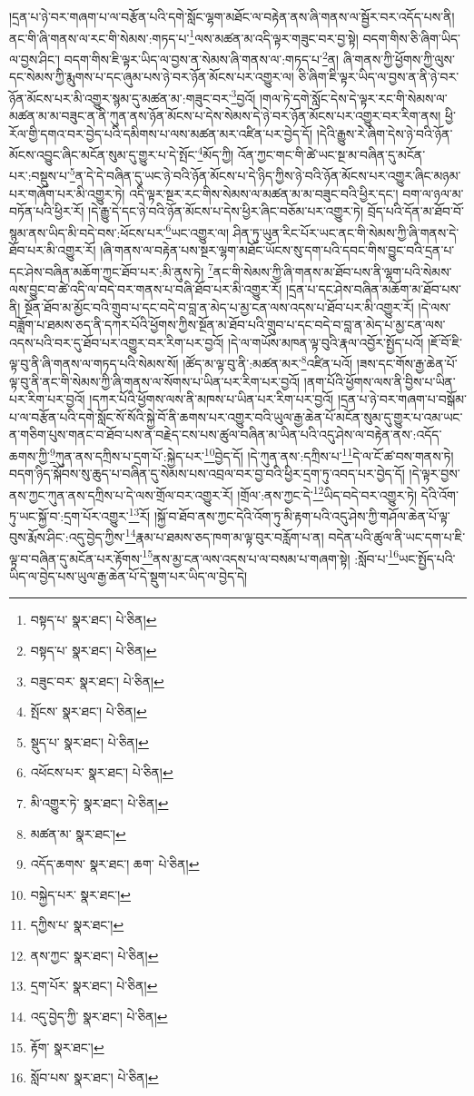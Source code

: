 །དྲན་པ་ཉེ་བར་གཞག་པ་ལ་བརྩོན་པའི་དགེ་སློང་ལྷག་མཐོང་ལ་བརྟེན་ནས་ཞི་གནས་ལ་སྦྱོར་བར་འདོད་པས་ནི། ནང་གི་ཞི་གནས་ལ་རང་གི་སེམས་:གཏད་པ་\footnote{བསྟད་པ་  སྣར་ཐང་།  པེ་ཅིན། }ལས་མཚན་མ་འདི་ལྟར་གཟུང་བར་བྱ་སྟེ། བདག་གིས་ཅི་ཞིག་ཡིད་ལ་བྱས་ཤིང་། བདག་གིས་ཇི་ལྟར་ཡིད་ལ་བྱས་ན་སེམས་ཞི་གནས་ལ་:གཏད་པ་\footnote{བསྟད་པ་  སྣར་ཐང་།  པེ་ཅིན། }ན། ཞི་གནས་ཀྱི་ཕྱོགས་ཀྱི་ལུས་དང་སེམས་ཀྱི་རྨུགས་པ་དང་ཞུམ་པས་ཉེ་བར་ཉོན་མོངས་པར་འགྱུར་ལ། ཅི་ཞིག་ཇི་ལྟར་ཡིད་ལ་བྱས་ན་ནི་ཉེ་བར་ཉོན་མོངས་པར་མི་འགྱུར་སྙམ་དུ་མཚན་མ་:གཟུང་བར་\footnote{བཟུང་བར་  སྣར་ཐང་།  པེ་ཅིན། }བྱའོ། །གལ་ཏེ་དགེ་སློང་དེས་དེ་ལྟར་རང་གི་སེམས་ལ་མཚན་མ་མ་བཟུང་ན་ནི་ཀུན་ནས་ཉོན་མོངས་པ་དེས་སེམས་དེ་ཉེ་བར་ཉོན་མོངས་པར་འགྱུར་བར་རིག་ནས། ཕྱི་རོལ་གྱི་དགའ་བར་བྱེད་པའི་དམིགས་པ་ལས་མཚན་མར་འཛིན་པར་བྱེད་དོ། །དེའི་རྒྱུས་རེ་ཞིག་དེས་ཉེ་བའི་ཉོན་མོངས་འབྱུང་ཞིང་མངོན་སུམ་དུ་གྱུར་པ་དེ་སྤོང་\footnote{སྤོངས་  སྣར་ཐང་།  པེ་ཅིན། }མོད་ཀྱི། འོན་ཀྱང་གང་གི་ཚེ་ཡང་སྔ་མ་བཞིན་དུ་མངོན་པར་:བསྡུས་པ་\footnote{སྡུད་པ་  སྣར་ཐང་།  པེ་ཅིན། }ན་དེ་དེ་བཞིན་དུ་ཡང་ཉེ་བའི་ཉོན་མོངས་པ་དེ་ཉིད་ཀྱིས་ཉེ་བའི་ཉོན་མོངས་པར་འགྱུར་ཞིང་མཉམ་པར་གཞོག་པར་མི་འགྱུར་ཏེ། འདི་ལྟར་སྔར་རང་གིས་སེམས་ལ་མཚན་མ་མ་བཟུང་བའི་ཕྱིར་དང་། བག་ལ་ཉལ་མ་བཏོན་པའི་ཕྱིར་རོ། །དེ་རྒྱུ་དེ་དང་ཉེ་བའི་ཉོན་མོངས་པ་དེས་ཕྱིར་ཞིང་བཅོམ་པར་འགྱུར་ཏེ། བྲོད་པའི་དོན་མ་ཐོབ་བོ་སྙམ་ནས་ཡིད་མི་བདེ་བས་:ཕོངས་པར་\footnote{འཕོངས་པར་  སྣར་ཐང་།  པེ་ཅིན། }ཡང་འགྱུར་ལ། ཤིན་ཏུ་ཡུན་རིང་པོར་ཡང་ནང་གི་སེམས་ཀྱི་ཞི་གནས་དེ་ཐོབ་པར་མི་འགྱུར་རོ། །ཞི་གནས་ལ་བརྟེན་པས་སྔར་ལྷག་མཐོང་ཡོངས་སུ་དག་པའི་དབང་གིས་བྱུང་བའི་དྲན་པ་དང་ཤེས་བཞིན་མཆོག་ཀྱང་ཐོབ་པར་:མི་ནུས་ཏེ། \footnote{མི་འགྱུར་ཏེ་  སྣར་ཐང་།  པེ་ཅིན། }ནང་གི་སེམས་ཀྱི་ཞི་གནས་མ་ཐོབ་པས་ནི་ལྷག་པའི་སེམས་ལས་བྱུང་བ་ཚེ་འདི་ལ་བདེ་བར་གནས་པ་བཞི་ཐོབ་པར་མི་འགྱུར་རོ། །དྲན་པ་དང་ཤེས་བཞིན་མཆོག་མ་ཐོབ་པས་ནི། སྔོན་ཐོབ་མ་མྱོང་བའི་གྲུབ་པ་དང་བདེ་བ་བླ་ན་མེད་པ་མྱ་ངན་ལས་འདས་པ་ཐོབ་པར་མི་འགྱུར་རོ། །དེ་ལས་བཟློག་པ་ཐམས་ཅད་ནི་དཀར་པོའི་ཕྱོགས་ཀྱིས་སྔོན་མ་ཐོབ་པའི་གྲུབ་པ་དང་བདེ་བ་བླ་ན་མེད་པ་མྱ་ངན་ལས་འདས་པའི་བར་དུ་ཐོབ་པར་འགྱུར་བར་རིག་པར་བྱའོ། །དེ་ལ་གཡོས་མཁན་ལྟ་བུའི་རྣལ་འབྱོར་སྤྱོད་པའོ། །ཇོ་བོ་ཇི་ལྟ་བུ་ནི་ཞི་གནས་ལ་གཏད་པའི་སེམས་སོ། །ཚོད་མ་ལྟ་བུ་ནི་:མཚན་མར་\footnote{མཚན་མ་  སྣར་ཐང་། }འཛིན་པའོ། །ཟས་དང་གོས་རྒྱ་ཆེན་པོ་ལྟ་བུ་ནི་ནང་གི་སེམས་ཀྱི་ཞི་གནས་ལ་སོགས་པ་ཡིན་པར་རིག་པར་བྱའོ། །ནག་པོའི་ཕྱོགས་ལས་ནི་བྱིས་པ་ཡིན་པར་རིག་པར་བྱའོ། །དཀར་པོའི་ཕྱོགས་ལས་ནི་མཁས་པ་ཡིན་པར་རིག་པར་བྱའོ། །དྲན་པ་ཉེ་བར་གཞག་པ་བསྒོམ་པ་ལ་བརྩོན་པའི་དགེ་སློང་སོ་སོའི་སྐྱེ་བོ་ནི་ཆགས་པར་འགྱུར་བའི་ཡུལ་རྒྱ་ཆེན་པོ་མངོན་སུམ་དུ་གྱུར་པ་འམ་ཡང་ན་གཅིག་པུས་གནང་བ་ཐོབ་པས་ན་བརྗེད་ངས་པས་ཚུལ་བཞིན་མ་ཡིན་པའི་འདུ་ཤེས་ལ་བརྟེན་ནས་:འདོད་ཆགས་ཀྱི་\footnote{འདོད་ཆགས་  སྣར་ཐང་། ཆག་  པེ་ཅིན། }ཀུན་ནས་དཀྲིས་པ་དྲག་པོ་:སྐྱེད་པར་\footnote{བསྐྱེད་པར་  སྣར་ཐང་། }བྱེད་དོ། །དེ་ཀུན་ནས་:དཀྲིས་པ་\footnote{དཀྱིས་པ་  སྣར་ཐང་། }དེ་ལ་ངོ་ཚ་བས་གནས་ཏེ། བདག་ཉིད་སྐོབས་སུ་ཆུད་པ་བཞིན་དུ་སེམས་པས་འབྲལ་བར་བྱ་བའི་ཕྱིར་དྲག་ཏུ་འབད་པར་བྱེད་དོ། །དེ་ལྟར་བྱས་ནས་ཀྱང་ཀུན་ནས་དཀྲིས་པ་དེ་ལས་གྲོལ་བར་འགྱུར་རོ། །གྲོལ་:ནས་ཀྱང་དེ་\footnote{ནས་ཀྱང་  སྣར་ཐང་།  པེ་ཅིན། }ཡིད་བདེ་བར་འགྱུར་ཏེ། དེའི་འོག་ཏུ་ཡང་སྐྱོ་བ་:དྲག་པོར་འགྱུར་\footnote{དྲག་པོར་  སྣར་ཐང་།  པེ་ཅིན། }རོ། །སྐྱོ་བ་ཐོབ་ནས་ཀྱང་དེའི་འོག་ཏུ་མི་རྟག་པའི་འདུ་ཤེས་ཀྱི་གཤོལ་ཆེན་པོ་ལྟ་བུས་རྨོས་ཤིང་:འདུ་བྱེད་ཀྱིས་\footnote{འདུ་བྱེད་ཀྱི་  སྣར་ཐང་།  པེ་ཅིན། }རྣམ་པ་ཐམས་ཅད་ཁག་མ་ལྟ་བུར་བརློག་པ་ན། བདེན་པའི་ཚུལ་ནི་ཡང་དག་པ་ཇི་ལྟ་བ་བཞིན་དུ་མངོན་པར་རྟོགས་\footnote{རྟོག་  སྣར་ཐང་། }ནས་མྱ་ངན་ལས་འདས་པ་ལ་བསམ་པ་གཞག་སྟེ། :སློབ་པ་\footnote{སློབ་པས་  སྣར་ཐང་།  པེ་ཅིན། }ཡང་སྤྱོད་པའི་ཡིད་ལ་བྱེད་པས་ཡུལ་རྒྱ་ཆེན་པོ་དེ་སྡུག་པར་ཡིད་ལ་བྱེད་དེ། 